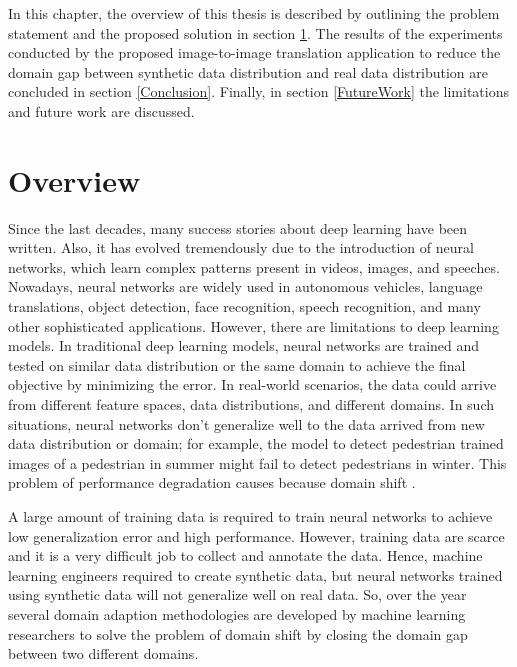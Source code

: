 \justifying
\setlength{\parskip}{1em}



In this chapter, the overview of this thesis is described by outlining the problem statement and the proposed solution in section \ref{Overview}. The results of the experiments conducted by the proposed image-to-image translation application to reduce the domain gap between synthetic data distribution and real data distribution are concluded in section \ref{Conclusion}. Finally, in section \ref{FutureWork} the limitations and future work are discussed.


\section{Overview}\label{Overview}

Since the last decades, many success stories about deep learning have been written. Also, it has evolved tremendously due to the introduction of neural networks, which learn complex patterns present in videos, images, and speeches. Nowadays, neural networks are widely used in autonomous vehicles, language translations, object detection, face recognition, speech recognition, and many other sophisticated applications. However, there are limitations to deep learning models. In traditional deep learning models, neural networks are trained and tested on similar data distribution or the same domain to achieve the final objective by minimizing the error. In real-world scenarios, the data could arrive from different feature spaces, data distributions, and different domains. In such situations, neural networks don't generalize well to the data arrived from new data distribution or domain; for example, the model to detect pedestrian trained images of a pedestrian in summer might fail to detect pedestrians in winter. This problem of performance degradation causes because domain shift \cite{farahani2020brief}.

A large amount of training data is required to train neural networks to achieve low generalization error and high performance. However, training data are scarce and it is a very difficult job to collect and annotate the data. Hence, machine learning engineers required to create synthetic data, but neural networks trained using synthetic data will not generalize well on real data. So, over the year several domain adaption methodologies are developed by machine learning researchers to solve the problem of domain shift by closing the domain gap between two different domains\cite{farahani2020brief}. 


